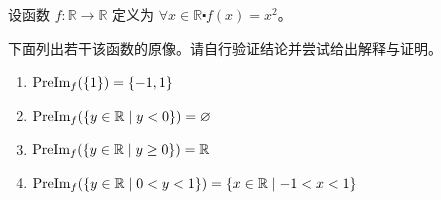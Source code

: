 \begin{example}
    设函数 $f : \mathbb{R} \to \mathbb{R}$ 定义为 $\forall x \in \mathbb{R} \centerdot f(x) = x^2$。

    下面列出若干该函数的原像。请自行验证结论并尝试给出解释与证明。

    \begin{enumerate}[label=(\arabic*)]
        \item $\text{PreIm}_f (\{1\}) = \{-1, 1\}$
        \item $\text{PreIm}_f (\{y \in \mathbb{R} \mid y < 0\}) = \varnothing$
        \item $\text{PreIm}_f (\{y \in \mathbb{R} \mid y \ge 0\}) = \mathbb{R}$
        \item $\text{PreIm}_f (\{y \in \mathbb{R} \mid 0 < y < 1\}) = \{x \in \mathbb{R} \mid -1 < x < 1\}$
    \end{enumerate}
\end{example}